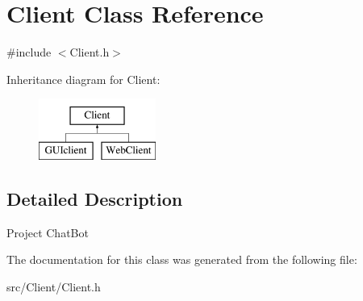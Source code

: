\hypertarget{classClient}{}\section{Client Class Reference}
\label{classClient}


{\ttfamily \#include $<$Client.\+h$>$}

Inheritance diagram for Client\+:\begin{figure}[H]
\begin{center}
\leavevmode
\includegraphics[height=2.000000cm]{classClient}
\end{center}
\end{figure}


\subsection{Detailed Description}
Project Chat\+Bot 

The documentation for this class was generated from the following file\+:\begin{DoxyCompactItemize}
\item 
src/\+Client/Client.\+h\end{DoxyCompactItemize}

